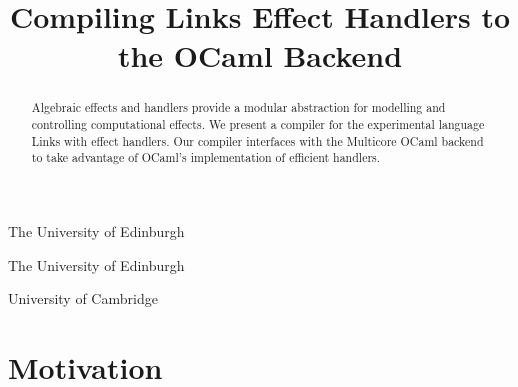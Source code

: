 \documentclass[preprint,numbers]{sigplanconf}
\newcommand{\msgbox}[2]{{%
  \par\noindent\small\color{red}%
  \framebox{\parbox{\dimexpr\linewidth-2\fboxsep-2\fboxrule}{\textbf{#1:} #2}}%
}}
\newcommand{\sam}[1]{\msgbox{Sam}{#1}}
\newcommand{\kc}[1]{\msgbox{KC}{#1}}
\begin{document}
\makeatletter
\def\@copyrightspace{\relax}
\makeatother

\setlength{\pdfpageheight}{\paperheight}
\setlength{\pdfpagewidth}{\paperwidth}

\newcommand{\camacuk}{@cam.ac.uk}
\newcommand{\edacuk}{@ed.ac.uk}
\newcommand{\contact}[2]{#1@#2}
\newcommand{\reachme}[1]{\hyperlink{mailto:\contact{#1}}{\contact{#1}}}

\preprintfooter{} %

\title{Compiling Links Effect Handlers to the OCaml Backend}
           {The University of Edinburgh}
           {~}%

           {The University of Edinburgh}
           {~}%

           {University of Cambridge}
           {~}

\maketitle

\begin{abstract}
  Algebraic effects and handlers provide a modular abstraction for
  modelling and controlling computational effects. We present a
  compiler for the experimental language Links with effect
  handlers. Our compiler interfaces with the Multicore OCaml backend
  to take advantage of OCaml's implementation of efficient handlers.
\end{abstract}

\section{Motivation}

\end{document}
